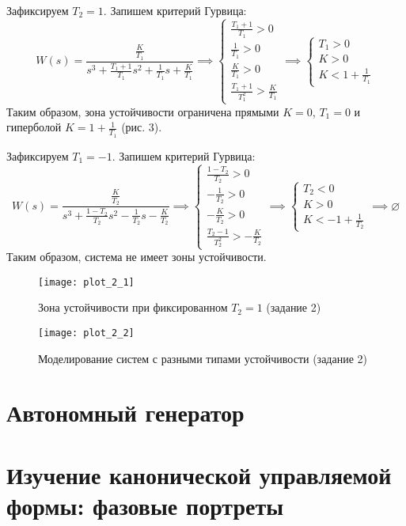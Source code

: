 Зафиксируем $T_2 = 1$. Запишем критерий Гурвица:
\begin{equation*}
    W(s) = \frac{\frac{K}{T_1}}{s^3 + \frac{T_1 + 1}{T_1} s^2 + \frac{1}{T_1}s + \frac{K}{T_1}}
    \implies 
    \begin{cases}
        \frac{T_1 + 1}{T_1} > 0 \\
        \frac{1}{T_1} > 0 \\
        \frac{K}{T_1} > 0 \\
        \frac{T_1 + 1}{T_1 ^ 2} > \frac{K}{T_1}
    \end{cases} \implies
    \begin{cases}
        T_1 > 0 \\
        K > 0 \\
        K < 1 + \frac{1}{T_1}
    \end{cases}
\end{equation*}
Таким образом, зона устойчивости ограничена прямыми $K=0$, $T_1=0$ и гиперболой $K = 1 + \frac{1}{T_1}$ (рис. 3).

Зафиксируем $T_1 = -1$. Запишем критерий Гурвица:
\begin{equation*}
    W(s) = \frac{\frac{K}{T_2}}{s^3 + \frac{1 - T_2}{T_2} s^2 - \frac{1}{T_2}s - \frac{K}{T_2}}
    \implies 
    \begin{cases}
        \frac{1 - T_2}{T_2} > 0 \\
        -\frac{1}{T_2} > 0 \\
        -\frac{K}{T_2} > 0 \\
        \frac{T_2 - 1}{T_2 ^ 2} > -\frac{K}{T_2}
    \end{cases} \implies
    \begin{cases}
        T_2 < 0 \\
        K > 0 \\
        K < -1 + \frac{1}{T_2}
    \end{cases} \implies \varnothing
\end{equation*}
Таким образом, система не имеет зоны устойчивости.

\begin{figure}[]
    \centering
    \texttt{[image: plot\_2\_1]}
    \caption{\label{fig:The-caption-1}Зона устойчивости при фиксированном $T_2=1$ (задание 2)}
\end{figure}
\begin{figure}[]
    \centering
    \texttt{[image: plot\_2\_2]}
    \caption{\label{fig:The-caption-1}Моделирование систем с разными типами устойчивости (задание 2)}
\end{figure}
\pagebreak

\section{Автономный генератор}

\pagebreak

\section{Изучение канонической управляемой формы: фазовые портреты}

\pagebreak